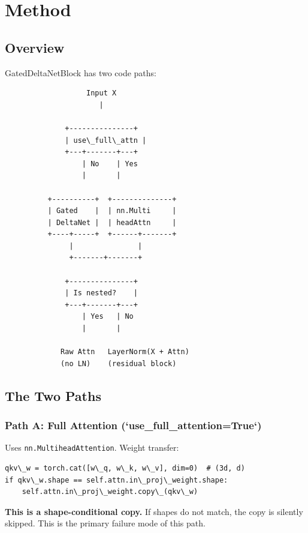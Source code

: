 
\section{Method}

\subsection{Overview}

GatedDeltaNetBlock has two code paths:

\begin{lstlisting}
                   Input X
                      |
                       
              +---------------+
              | use\_full\_attn |
              +---+-------+---+
                  | No    | Yes
                  |       |
                           
          +----------+  +--------------+
          | Gated    |  | nn.Multi     |
          | DeltaNet |  | headAttn     |
          +----+-----+  +------+-------+
               |               |
               +-------+-------+
                        
              +---------------+
              | Is nested?    |
              +---+-------+---+
                  | Yes   | No
                  |       |
                           
             Raw Attn   LayerNorm(X + Attn)
             (no LN)    (residual block)
\end{lstlisting}

\subsection{The Two Paths}

\subsubsection{Path A: Full Attention (`use\_full\_attention=True`)}

Uses \texttt{nn.MultiheadAttention}. Weight transfer:

\begin{lstlisting}
qkv\_w = torch.cat([w\_q, w\_k, w\_v], dim=0)  # (3d, d)
if qkv\_w.shape == self.attn.in\_proj\_weight.shape:
    self.attn.in\_proj\_weight.copy\_(qkv\_w)
\end{lstlisting}

\textbf{This is a shape-conditional copy.} If shapes do not match, the copy is 
silently skipped. This is the primary failure mode of this path.

